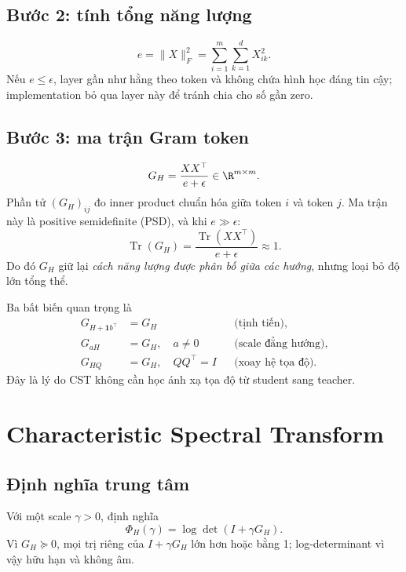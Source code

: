 \documentclass{article}
\newcommand{\cst}{\textsc{CST}}
\begin{document}
\subsection{Bước 2: tính tổng năng lượng}

\begin{equation}
 e=\lVert X\rVert_F^2
 =\sum_{i=1}^{m}\sum_{k=1}^{d}X_{ik}^2.
 \label{eq:energy}
\end{equation}
Nếu $e\leq\epsilon$, layer gần như hằng theo token và không chứa hình học đáng
tin cậy; implementation bỏ qua layer này để tránh chia cho số gần zero.

\subsection{Bước 3: ma trận Gram token}

\begin{equation}
 G_H=\frac{XX^\top}{e+\epsilon}\in\R^{m\times m}.
 \label{eq:gram}
\end{equation}
Phần tử $(G_H)_{ij}$ đo inner product chuẩn hóa giữa token $i$ và token $j$.
Ma trận này là positive semidefinite (PSD), và khi $e\gg\epsilon$:
\begin{equation}
 \operatorname{Tr}(G_H)
 =\frac{\operatorname{Tr}(XX^\top)}{e+\epsilon}
 \approx1.
\end{equation}
Do đó $G_H$ giữ lại \emph{cách năng lượng được phân bố giữa các hướng}, nhưng
loại bỏ độ lớn tổng thể.

Ba bất biến quan trọng là
\begin{align}
 G_{H+\mathbf1b^\top}&=G_H &&\text{(tịnh tiến)},\\
 G_{aH}&=G_H,\quad a\neq0 &&\text{(scale đẳng hướng)},\\
 G_{HQ}&=G_H,\quad QQ^\top=I &&\text{(xoay hệ tọa độ)}.
\end{align}
Đây là lý do \cst{} không cần học ánh xạ tọa độ từ student sang teacher.

\section{Characteristic Spectral Transform}

\subsection{Định nghĩa trung tâm}

Với một scale $\gamma>0$, định nghĩa
\begin{equation}
 \boxed{
 \Phi_H(\gamma)=\log\det(I+\gamma G_H)}.
 \label{eq:cst}
\end{equation}
Vì $G_H\succeq0$, mọi trị riêng của $I+\gamma G_H$ lớn hơn hoặc bằng 1;
log-determinant vì vậy hữu hạn và không âm.
\end{document}
